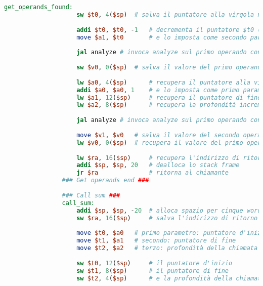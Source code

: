 \begin{center}
\begin{lstlisting}[language=mips, gobble=14, stepnumber=1]
                get_operands_found:
                    sw $t0, 4($sp)  # salva il puntatore alla virgola nello stack
                    
                    addi $t0, $t0, -1   # decrementa il puntatore $t0 (carattere subito prima della virgola)
                    move $a1, $t0       # e lo imposta come secondo parametro per analyze
                    
                    jal analyze # invoca analyze sul primo operando con profondità incrementata di 1
                    
                    sw $v0, 0($sp)  # salva il valore del primo operando nello stack
                    
                    lw $a0, 4($sp)      # recupera il puntatore alla virgola
                    addi $a0, $a0, 1    # e lo imposta come primo parametro (puntatore d'inizio) incrementandolo di 1 (primo carattere dopo la virgola)
                    lw $a1, 12($sp)     # recupera il puntatore di fine
                    lw $a2, 8($sp)      # recupera la profondità incrementata di 1
                    
                    jal analyze # invoca analyze sul primo operando con profondità incrementata di 1
                    
                    move $v1, $v0   # salva il valore del secondo operando come secondo risultato
                    lw $v0, 0($sp)  # recupera il valore del primo operando e lo imposta come primo risultato
                    
                    lw $ra, 16($sp)     # recupera l'indirizzo di ritorno
                    addi $sp, $sp, 20   # dealloca lo stack frame
                    jr $ra              # ritorna al chiamante
                ### Get operands end ###
                
                ### Call sum ###
                call_sum:
                    addi $sp, $sp, -20  # alloca spazio per cinque words nello stack frame
                    sw $ra, 16($sp)     # salva l'indirizzo di ritorno nello stack
                    
                    move $t0, $a0   # primo parametro: puntatore d'inizio
                    move $t1, $a1   # secondo: puntatore di fine
                    move $t2, $a2   # terzo: profondità della chiamata
                    
                    sw $t0, 12($sp)     # il puntatore d'inizio
                    sw $t1, 8($sp)      # il puntatore di fine
                    sw $t2, 4($sp)      # e la profondità della chiamata
                    

\end{lstlisting}
\end{center}
